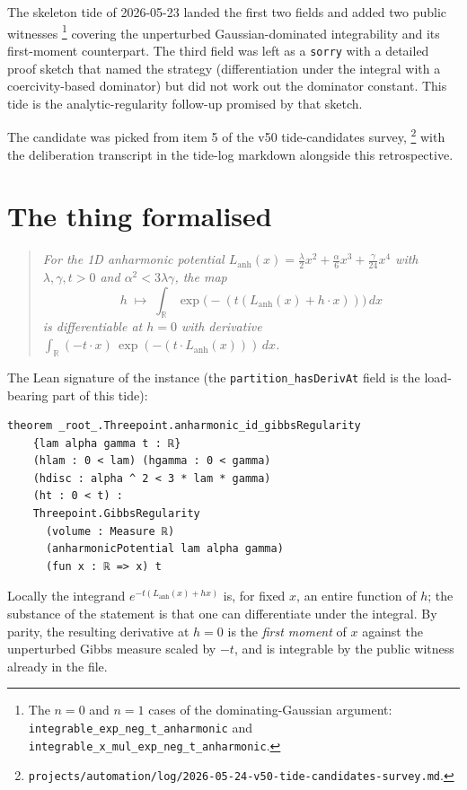 \documentclass[11pt]{article}
\begin{document}
The skeleton tide of 2026-05-23 landed the first two fields and added
two public witnesses%
\footnote{The \(n=0\) and \(n=1\) cases of the dominating-Gaussian
argument:
\texttt{integrable\_exp\_neg\_t\_anharmonic} and
\texttt{integrable\_x\_mul\_exp\_neg\_t\_anharmonic}.}
covering the unperturbed Gaussian-dominated integrability and its
first-moment counterpart. The third field was left as a
\texttt{sorry} with a detailed proof sketch that named the strategy
(differentiation under the integral with a coercivity-based
dominator) but did not work out the dominator constant. This tide is
the analytic-regularity follow-up promised by that sketch.

The candidate was picked from item 5 of the v50 tide-candidates
survey,%
\footnote{\texttt{projects/automation/log/2026-05-24-v50-tide-candidates-survey.md}.}
with the deliberation transcript in the tide-log markdown alongside
this retrospective.

\section{The thing formalised}

\begin{quote}\itshape
For the 1D anharmonic potential
\(L_{\mathrm{anh}}(x) = \tfrac{\lambda}{2}x^2 + \tfrac{\alpha}{6}x^3 + \tfrac{\gamma}{24}x^4\)
with \(\lambda, \gamma, t > 0\) and \(\alpha^2 < 3\lambda\gamma\),
the map
\[
h \;\mapsto\; \int_{\mathbb{R}} \exp\!\big(-(t (L_{\mathrm{anh}}(x) + h \cdot x))\big) \, dx
\]
is differentiable at \(h = 0\) with derivative
\(\int_{\mathbb{R}} (-t \cdot x) \, \exp(-(t \cdot L_{\mathrm{anh}}(x))) \, dx\).
\end{quote}

\noindent The Lean signature of the instance (the
\texttt{partition\_hasDerivAt} field is the load-bearing part of this
tide):
\begin{verbatim}
theorem _root_.Threepoint.anharmonic_id_gibbsRegularity
    {lam alpha gamma t : ℝ}
    (hlam : 0 < lam) (hgamma : 0 < gamma)
    (hdisc : alpha ^ 2 < 3 * lam * gamma)
    (ht : 0 < t) :
    Threepoint.GibbsRegularity
      (volume : Measure ℝ)
      (anharmonicPotential lam alpha gamma)
      (fun x : ℝ => x) t
\end{verbatim}

Locally the integrand \(e^{-t(L_{\mathrm{anh}}(x) + h x)}\) is, for
fixed \(x\), an entire function of \(h\); the substance of the
statement is that one can differentiate under the integral. By
parity, the resulting derivative at \(h = 0\) is the \emph{first
moment} of \(x\) against the unperturbed Gibbs measure scaled by
\(-t\), and is integrable by the public witness already in the file.
\end{document}
